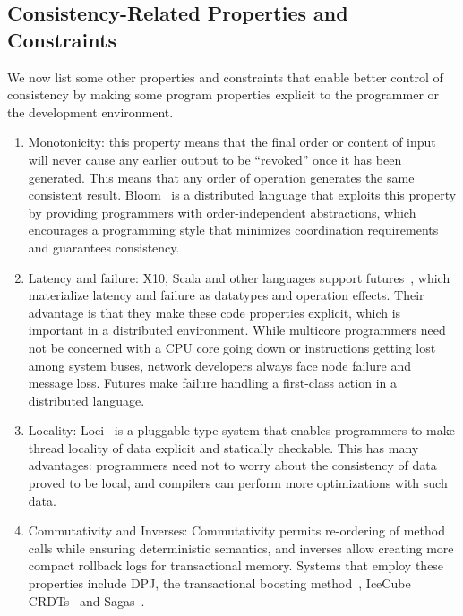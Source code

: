 \documentclass[]{usiinfprospectus}
\begin{document}
\subsection{Consistency-Related Properties and Constraints}
We now list some other properties and constraints that enable better control of consistency by making some program properties explicit to the programmer or the development environment. 
\begin{enumerate}
	\itemsep0em
\item Monotonicity: this property means that the final order or content of input will never cause any earlier output to be ``revoked'' once it has been generated. This means that any order of operation generates the same consistent result. Bloom~\cite{alvaro2011consistency} is a distributed language that exploits this property by providing programmers with order-independent abstractions, which encourages a programming style that minimizes coordination requirements and guarantees consistency.

\item Latency and failure: X10, Scala and other languages support futures~\cite{hallerfutures}, which materialize latency and failure as datatypes and operation effects. Their advantage is that they make these code properties explicit, which is important in a distributed environment. While multicore programmers need not be concerned with a CPU core going down or instructions getting lost among system buses, network developers always face node failure and message loss. Futures make failure handling a first-class action in a distributed language.

\item Locality: Loci~\cite{wrigstad2009loci} is a pluggable type system that enables programmers to make thread locality of data explicit and statically checkable. This has many advantages: programmers need not to worry about the consistency of data proved to be local, and compilers can perform more optimizations with such data. 

\item Commutativity and Inverses: Commutativity permits re-ordering of method calls while ensuring deterministic semantics, and inverses allow creating more compact rollback logs for transactional memory. Systems that employ these properties include DPJ, the transactional boosting method~\cite{herlihy2008transactional}, IceCube~\cite{Kermarrec:2001:IAR:383962.384020} CRDTs~\cite{shapiro2011conflict} and Sagas~\cite{Garcia-Molina:1987:SAG:38714.38742}.



\end{enumerate}
\end{document}
